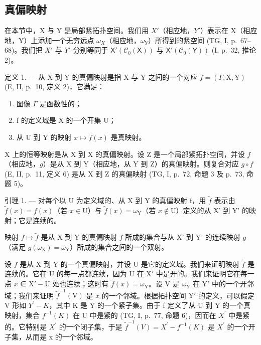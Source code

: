 \subsection{真偏映射}

在本节中，X 与 Y 是局部紧拓扑空间。我们用 \(X'\)（相应地，\(Y'\)）表示在 X（相应地，Y）上添加一个无穷远点 \(\omega_{X}\)（相应地，\(\omega_{Y}\)）所得到的紧空间 (TG, I, p.~67--68)。我们把 \(X'\) 与 \(Y'\) 分别等同于 \(\mathsf{X}'(\mathcal{C}_{0}(\mathsf{X}))\) 与 \(\mathsf{X}'(\mathcal{C}_{0}(\mathsf{Y}))\) (I, p.~32, 推论 2)。

定义 1. --- 从 X 到 Y 的真偏映射是指 X 与 Y 之间的一个对应 \(f = (\Gamma, \mathrm{X}, \mathrm{Y})\) (E, II, p.~10, 定义 2)，它满足：

\begin{enumerate}
\def\labelenumi{(\roman{enumi})}
\item
  图像 \(\Gamma\) 是函数性的；
\item
  f 的定义域是 X 的一个开集 U；
\item
  从 U 到 Y 的映射 \(x\mapsto f(x)\) 是真映射。
\end{enumerate}

X 上的恒等映射是从 X 到 X 的真偏映射。设 Z 是一个局部紧拓扑空间，并设 \(f\)（相应地，\(g\)）是从 X 到 Y（相应地，从 Y 到 Z）的真偏映射。则复合对应 \(g \circ f\) (E, II, p.~11, 定义 6) 是从 X 到 Z 的真偏映射 (TG, I, p.~72, 命题 3 及 p.~73, 命题 5)。

引理 1. --- 对每个以 U 为定义域的、从 X 到 Y 的真偏映射 f，用 \(\widetilde{f}\) 表示由 \(\widetilde{f}(x) = f(x)\)（若 \(x \in \mathrm{U}\)）与 \(\widetilde{f}(x) = \omega_{\mathrm{Y}}\)（若 \(x \notin \mathrm{U}\)）定义的从 X' 到 Y' 的映射；它是连续的。

映射 \(f \mapsto \widetilde{f}\) 是从 X 到 Y 的真偏映射 \(f\) 所成的集合与从 X' 到 Y' 的连续映射 \(g\)（满足 \(g(\omega_{\mathrm{X}}) = \omega_{\mathrm{Y}}\)）所成的集合之间的一个双射。

设 \(f\) 是从 X 到 Y 的一个真偏映射，并设 U 是它的定义域。我们来证明映射 \(\widetilde{f}\) 是连续的。它在 U 的每一点都连续，因为 U 在 \(\mathrm{X}'\) 中是开的。我们来证明它在每一点 \(x\) ∈ \(\mathrm{X}' - \mathrm{U}\) 处也连续；这时有 \(\widetilde{f}(x) = \omega_{\mathrm{Y}}\)。设 V 是 \(\omega_{\mathrm{Y}}\) 在 \(\mathrm{Y}'\) 中的一个开邻域；我们来证明 \(\widetilde{f}^{-1}(\mathrm{V})\) 是 \(x\) 的一个邻域。根据拓扑空间 \(\mathrm{Y}'\) 的定义，可以假定 V 形如 \(Y^{\prime}-K\)，其中 K 是 Y 的一个紧子集。由于 f 定义了从 U 到 Y 的一个真映射，集合 \(f^{-1}(K)\) 在 U 中是紧的 (TG, I, p.~77, 命题 6)，因而在 \(X^{\prime}\) 中是紧的。它特别是 \(X^{\prime}\) 的一个闭子集，于是 \(\tilde{f}^{-1}(V)=X^{\prime}-f^{-1}(K)\) 是 \(X^{\prime}\) 的一个开子集，从而是 x 的一个邻域。

